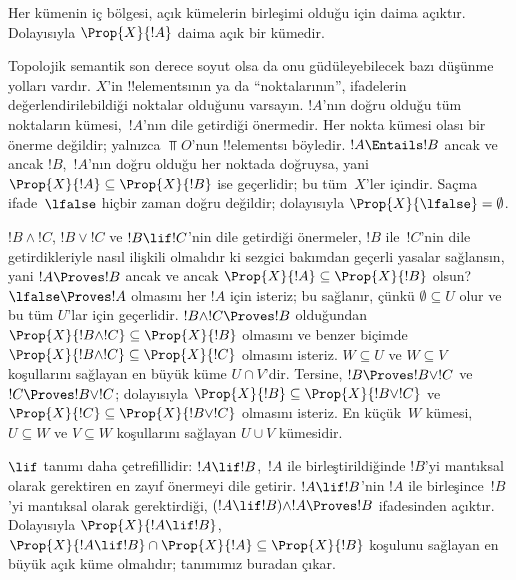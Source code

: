 \documentclass[../../../include/open-logic-section]{subfiles}
\begin{document}
Her kümenin iç bölgesi, açık kümelerin birleşimi olduğu için daima açıktır.
Dolayısıyla $\Prop{X}{!A}$ daima açık bir kümedir.

Topolojik semantik son derece soyut olsa da onu güdüleyebilecek bazı düşünme
yolları vardır. $X$'in !!{element}s{}ının ya da ``noktalarının'', ifadelerin
değerlendirilebildiği noktalar olduğunu varsayın. $!A$'nın doğru olduğu tüm
noktaların kümesi,~$!A$'nın dile getirdiği önermedir. Her nokta kümesi olası
bir önerme değildir; yalnızca $\Top{O}$'nun !!{element}s{}ı böyledir. $!A
\Entails !B$ ancak ve ancak $!B$,~$!A$'nın doğru olduğu her noktada doğruysa,
yani $\Prop{X}{!A} \subseteq \Prop{X}{!B}$ ise geçerlidir; bu tüm~$X$'ler
içindir.
Saçma ifade~$\lfalse$ hiçbir zaman doğru değildir; dolayısıyla
$\Prop{X}{\lfalse} = \emptyset$.

$!B \land !C$, $!B \lor !C$ ve $!B \lif !C$'nin dile getirdiği önermeler,
$!B$ ile~$!C$'nin dile getirdikleriyle nasıl ilişkili olmalıdır ki sezgici
bakımdan geçerli yasalar sağlansın, yani $!A \Proves !B$ ancak ve ancak
$\Prop{X}{!A} \subseteq \Prop{X}{!B}$ olsun? $\lfalse \Proves !A$ olmasını
her $!A$ için isteriz; bu sağlanır, çünkü $\emptyset \subseteq U$ olur ve bu
tüm $U$'lar için geçerlidir. $!B \land !C \Proves !B$ olduğundan $\Prop{X}{!B \land !C}
\subseteq \Prop{X}{!B}$ olmasını ve benzer biçimde $\Prop{X}{!B \land !C}
\subseteq \Prop{X}{!C}$ olmasını isteriz. $W \subseteq U$ ve $W \subseteq V$
koşullarını sağlayan en büyük küme $U \cap V$'dir. Tersine, $!B \Proves !B
\lor !C$ ve $!C \Proves !B \lor !C$; dolayısıyla $\Prop{X}{!B} \subseteq
\Prop{X}{!B \lor !C}$ ve $\Prop{X}{!C} \subseteq \Prop{X}{!B \lor !C}$
olmasını isteriz. En küçük~$W$ kümesi, $U \subseteq W$ ve $V \subseteq W$
koşullarını sağlayan $U \cup V$ kümesidir.

$\lif$ tanımı daha çetrefillidir: $!A \lif !B$,~$!A$ ile birleştirildiğinde
$!B$'yi mantıksal olarak gerektiren en zayıf önermeyi dile getirir. $!A \lif
!B$'nin $!A$ ile birleşince~$!B$'yi mantıksal olarak gerektirdiği, $(!A \lif
!B) \land !A \Proves !B $ ifadesinden açıktır. Dolayısıyla $\Prop{X}{!A \lif
!B}$, $\Prop{X}{!A \lif !B} \cap \Prop{X}{!A} \subseteq \Prop{X}{!B}$
koşulunu sağlayan en büyük açık küme olmalıdır; tanımımız buradan çıkar.
\end{document}
